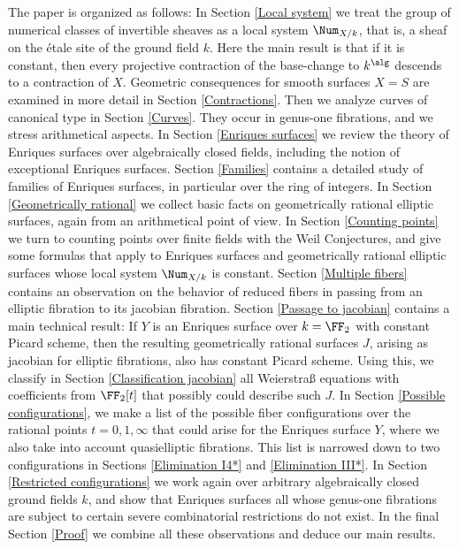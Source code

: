 The paper is organized as follows:
In Section \ref{Local system} we treat the group of numerical classes of invertible
sheaves as a local system $\Num_{X/k}$, that is, a sheaf on the \'etale site of the ground field $k$.
Here the main result is that if it is constant,
then every projective contraction of the base-change to $k^\alg$ descends to a contraction of
$X$.
Geometric consequences for smooth surfaces $X=S$ are examined in more detail in Section \ref{Contractions}.
Then we analyze curves of canonical type in Section \ref{Curves}. They
occur in genus-one fibrations, and we stress   arithmetical aspects.
In Section \ref{Enriques surfaces} we review the theory of Enriques surfaces over algebraically closed fields, including
the notion of exceptional Enriques surfaces. Section \ref{Families} contains a detailed study of families  of Enriques surfaces,
in particular over the ring of integers.
In Section \ref{Geometrically rational}
we collect basic facts on geometrically rational elliptic surfaces, again from an arithmetical point of view.
In Section \ref{Counting points}   we turn to counting points over finite fields with the Weil Conjectures,
and give some formulas that apply to Enriques surfaces and geometrically rational elliptic surfaces
whose local system $\Num_{X/k}$ is constant.
Section \ref{Multiple fibers} contains an observation on the behavior of reduced fibers in passing from
an elliptic fibration to its jacobian fibration.
Section \ref{Passage to jacobian} contains a main technical result: If $Y$ is an   Enriques surface over $k=\FF_2$
with constant Picard scheme, then the resulting geometrically rational surfaces $J$, arising as jacobian for
elliptic fibrations, also has constant Picard scheme.
Using this, we classify in Section \ref{Classification jacobian} all Weierstra\ss{} equations with coefficients from $\FF_2[t]$ that
possibly could describe such $J$. In Section \ref{Possible configurations}, we make a list of the possible fiber configurations
over the rational points $t=0,1,\infty$ that could arise for the Enriques surface $Y$,
where we also take into account quasielliptic fibrations.
This list is narrowed down to two configurations in Sections  \ref{Elimination I4*} and \ref{Elimination III*}.
In Section \ref{Restricted configurations} we   work again over arbitrary algebraically closed ground fields $k$, and show that
Enriques surfaces all whose genus-one fibrations are subject to certain severe combinatorial restrictions do not exist.
In the final Section \ref{Proof} we combine all these observations and deduce  our main results.

